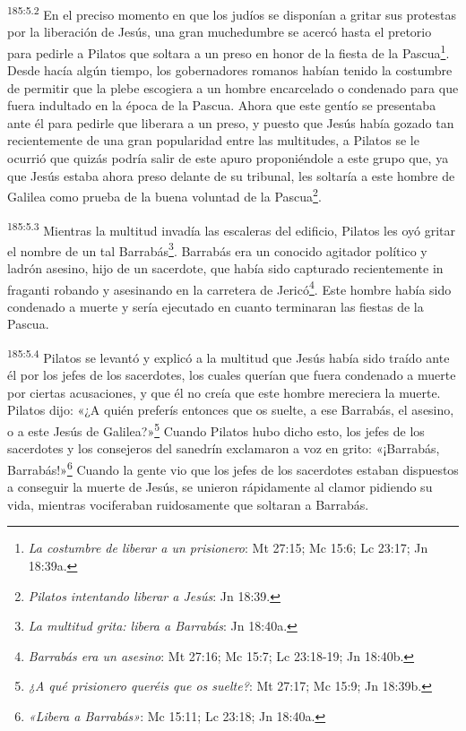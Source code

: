 \par
\textsuperscript{185:5.2} En el preciso momento en que los judíos se disponían a gritar sus protestas por la liberación de Jesús, una gran muchedumbre se acercó hasta el pretorio para pedirle a Pilatos que soltara a un preso en honor de la fiesta de la Pascua\footnote{\textit{La costumbre de liberar a un prisionero}: Mt 27:15; Mc 15:6; Lc 23:17; Jn 18:39a.}. Desde hacía algún tiempo, los gobernadores romanos habían tenido la costumbre de permitir que la plebe escogiera a un hombre encarcelado o condenado para que fuera indultado en la época de la Pascua. Ahora que este gentío se presentaba ante él para pedirle que liberara a un preso, y puesto que Jesús había gozado tan recientemente de una gran popularidad entre las multitudes, a Pilatos se le ocurrió que quizás podría salir de este apuro proponiéndole a este grupo que, ya que Jesús estaba ahora preso delante de su tribunal, les soltaría a este hombre de Galilea como prueba de la buena voluntad de la Pascua\footnote{\textit{Pilatos intentando liberar a Jesús}: Jn 18:39.}.

\par
\textsuperscript{185:5.3} Mientras la multitud invadía las escaleras del edificio, Pilatos les oyó gritar el nombre de un tal Barrabás\footnote{\textit{La multitud grita: libera a Barrabás}: Jn 18:40a.}. Barrabás era un conocido agitador político y ladrón asesino, hijo de un sacerdote, que había sido capturado recientemente in fraganti robando y asesinando en la carretera de Jericó\footnote{\textit{Barrabás era un asesino}: Mt 27:16; Mc 15:7; Lc 23:18-19; Jn 18:40b.}. Este hombre había sido condenado a muerte y sería ejecutado en cuanto terminaran las fiestas de la Pascua.

\par
\textsuperscript{185:5.4} Pilatos se levantó y explicó a la multitud que Jesús había sido traído ante él por los jefes de los sacerdotes, los cuales querían que fuera condenado a muerte por ciertas acusaciones, y que él no creía que este hombre mereciera la muerte. Pilatos dijo: «¿A quién preferís entonces que os suelte, a ese Barrabás, el asesino, o a este Jesús de Galilea?»\footnote{\textit{¿A qué prisionero queréis que os suelte?}: Mt 27:17; Mc 15:9; Jn 18:39b.} Cuando Pilatos hubo dicho esto, los jefes de los sacerdotes y los consejeros del sanedrín exclamaron a voz en grito: «¡Barrabás, Barrabás!»\footnote{\textit{«Libera a Barrabás»}: Mc 15:11; Lc 23:18; Jn 18:40a.} Cuando la gente vio que los jefes de los sacerdotes estaban dispuestos a conseguir la muerte de Jesús, se unieron rápidamente al clamor pidiendo su vida, mientras vociferaban ruidosamente que soltaran a Barrabás.


